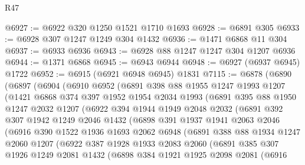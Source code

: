 \begin{lexlean}{R47}
\begin{coremodule}
@6927 := @6922 @320 @1250 @1521 @1710 @1693
@6928 := @6891 @305
@6933 := @6928 @307 @1247 @1249 @304 @1432
@6936 := @1471 @6868 @11 @304
@6937 := @6933 @6936
@6943 := @6928 @88 @1247 @1247 @304 @1207 @6936
@6944 := @1371 @6868
@6945 := @6943 @6944
@6948 := @6927 (@6937 @6945) @1722
@6952 := @6915 (@6921 @6948 @6945) @1831
@7115 := @6878
    (@6890
      (@6897
        (@6904
          (@6910
            @6952
            (@6891
              @398
              @88
              @1955
              @1247
              @1993
              @1207
              (@1421
                @6868
                @374
                @397
                @1952
                @1954
                @2034
                @1993
                (@6891
                  @395
                  @88
                  @1950
                  @1247
                  @2032
                  @1207
                  (@6922
                    @394
                    @1944
                    @1949
                    @2048
                    @2032
                    (@6891
                      @392
                      @307
                      @1942
                      @1249
                      @2046
                      @1432
                      (@6898
                        @391
                        @1937
                        @1941
                        @2063
                        @2046
                        (@6916
                          @390
                          @1522
                          @1936
                          @1693
                          @2062
                          @6948
                          (@6891
                            @388
                            @88
                            @1934
                            @1247
                            @2060
                            @1207
                            (@6922
                              @387
                              @1928
                              @1933
                              @2083
                              @2060
                              (@6891
                                @385
                                @307
                                @1926
                                @1249
                                @2081
                                @1432
                                (@6898
                                  @384
                                  @1921
                                  @1925
                                  @2098
                                  @2081
                                  (@6916

\end{coremodule}
\end{lexlean}

